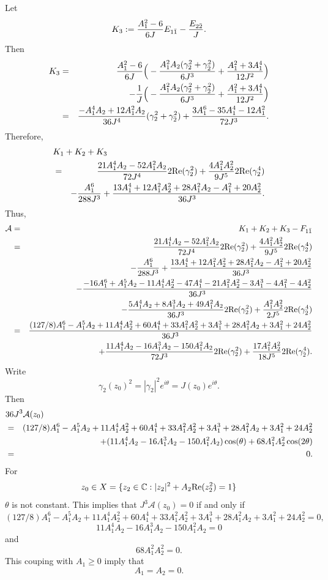 \documentclass[12pt]{amsart}
\def\CC{\mathbb{C}}
\def\cal{\mathcal}
\begin{document}
Let
$$
K_3:={A_1^2-6\over 6J} E_{1\bar1}-{E_{2\bar2}\over J}.
$$
Then 
\begin{eqnarray*}
K_3
&=&{A_1^2-6\over 6J} \Big(  -{A_1^2 A_2(\gamma_2^2+\gamma_{\bar2}^2)\over 6 J^3}+{A_1^2 +3A_1^4\over 12 J^2}\Big)\\
&&-{1 \over J}\Big(  -{A_1^2 A_2(\gamma_2^2+\gamma_{\bar2}^2)\over 6 J^3}+{A_1^2 +3A_1^4\over 12 J^2}\Big) \\
&=& {-A_1^4A_2+12A_1^2A_2 \over 36 J^4} (\gamma_2^2+\gamma_{\bar2}^2)+{3A_1^6-35A_1^4-12A_1^2 \over 72 J^3}.
\end{eqnarray*}
Therefore,
\begin{eqnarray*}
\lefteqn{ K_1+K_2+K_3}\\
&=&{21A_1^4A_2 -52 A_1^2 A_2\over 72 J^4} 2\hbox{Re}(\gamma_2^2)
 +{4 A_1^2 A_2^2 \over 9J^5} 2\hbox{Re}(\gamma_2^4)\\
 &&-{A_1^6\over288 J^3} +{13A_1^4+12 A_1^2A_2^2+28A_1^2A_2-A_1^2+20A_2^2 \over 36 J^3}.
\end{eqnarray*}
Thus,
\begin{eqnarray*}
{\cal A}&=&K_1+K_2+K_3-F_{1\bar1}\\
&=&{21A_1^4A_2 -52 A_1^2 A_2\over 72 J^4} 2\hbox{Re}(\gamma_2^2)
 +{4 A_1^2 A_2^2 \over 9J^5} 2\hbox{Re}(\gamma_2^4)\\
 &&-{A_1^6\over288 J^3}+{13A_1^4+ 12 A_1^2A_2^2+28A_1^2A_2-A_1^2+20A_2^2 \over 36 J^3}\\
 && -{-16A_1^6 +A_1^5A_2 -11A_1^4A_2^2 -47 A_1^4 -21 A_1^2 A_2^2 -3A_1^3 -4A_1^2-4A_2^2\over 36 J^3} \\
&& -{5A_1^4 A_2+8A_1^3A_2+49 A_1^2 A_2   \over 36 J^3} 2\hbox{Re}(\gamma_2^2) +{A_1^2A_2^2\over 2 J^5} 2\hbox{Re}( \gamma_{\bar2}^4)\\
&=&  {(127/8)A_1^6 -A_1^5A_2 +11A_1^4A_2^2 +60 A_1^4 +33 A_1^2 A_2^2 +3A_1^3 +28A_1^2A_2 +3A_1^2+24A_2^2\over 36 J^3} \\
&& +{11A_1^4 A_2-16A_1^3A_2-150A_1^2 A_2   \over 72 J^3} 2\hbox{Re}(\gamma_2^2) +{17A_1^2A_2^2\over 18 J^5} 2\hbox{Re}( \gamma_{\bar2}^4).
\end{eqnarray*}
Write
$$
\gamma_2(z_0)^2=|\gamma_2|^2 e^{i\theta}=J(z_0) e^{i\theta}.
$$
Then
\begin{eqnarray*}
\lefteqn{36J^3 {\cal A}(z_0)}\\
&=&  (127/8)A_1^6 -A_1^5A_2 +11A_1^4A_2^2 +60 A_1^4 +33 A_1^2 A_2^2 +3A_1^3 +28A_1^2A_2 +3A_1^2+24A_2^2 \\
&& +(11A_1^4 A_2-16A_1^3A_2-150A_1^2 A_2 ) \cos (\theta) +68 A_1^2A_2^2 \cos(2\theta)\\
 &=&0.
\end{eqnarray*}
For 
$$
z_0\in X=\{z_2\in \CC: |z_2|^2+A_2\hbox{Re}(z_2^2)=1\}
$$
$\theta $ is not constant. This implies that $J^3 {\cal A}(z_0)=0$ if and only if
$$
 (127/8)A_1^6 -A_1^5A_2 +11A_1^4A_2^2 +60 A_1^4 +33 A_1^2 A_2^2 +3A_1^3 +28A_1^2A_2 +3A_1^2+24A_2^2=0,
 $$
 $$
11A_1^4 A_2-16A_1^3A_2-150A_1^2 A_2 =0
$$
and
$$
68 A_1^2A_2^2 =0.
$$
This couping with $A_1\ge 0$ imply that
$$
A_1=A_2=0.
$$
\end{document}
